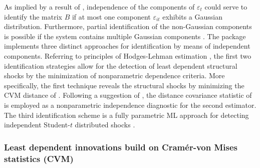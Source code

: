 \documentclass[nojss]{jss}\usepackage[]{graphicx}\usepackage[]{color}
\begin{document}
As implied by a result of \cite{Comon1994}, independence of the components of $\varepsilon_t$ could serve to  identify the matrix $B$ if at most one component $\varepsilon_{it}$ exhibits a Gaussian distribution. Furthermore, partial identification of the non-Gaussian components is possible if the system contains multiple Gaussian components \citep[cf.][]{MAXAND2018}. The  package implements three distinct approaches for identification by means of independent components. Referring to principles of Hodges-Lehman estimation \citep[HL estimation, ][]{HodgesLehman2006}, the first two identification strategies allow for the detection of least dependent structural shocks by the minimization of nonparametric dependence criteria. More specifically, the first technique reveals the structural shocks by minimizing the CVM distance of \cite{Genest2007}. Following a suggestion of \cite{Matteson2017}, the distance covariance statistic of \cite{Szek07} is employed as a nonparametric independence diagnostic for the second estimator. The third identification scheme is a fully parametric ML approach for detecting independent Student-$t$ distributed shocks \citep{LMS2017}.

\subsubsection{Least dependent innovations build on Cram\'er-von Mises statistics (CVM)}
\end{document}
